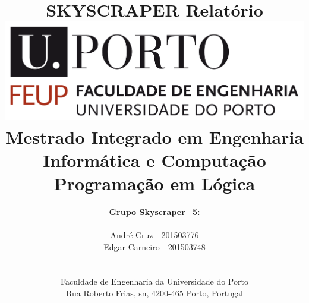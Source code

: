 \documentclass[a4paper]{article}
\begin{document}
\setlength{\textwidth}{16cm}
\setlength{\textheight}{22cm}

\title{\Huge\textbf{SKYSCRAPER}\linebreak\linebreak\linebreak
\Large\textbf{Relatório}\linebreak\linebreak
\linebreak\linebreak
\includegraphics[scale=0.1]{images/feup-logo.png}\linebreak\linebreak
\linebreak\linebreak
\Large{Mestrado Integrado em Engenharia Informática e Computação} \linebreak\linebreak
\Large{Programação em Lógica}\linebreak
}

\author{\textbf{Grupo Skyscraper\_5:}\\
\linebreak\\
André Cruz - 201503776 \\
Edgar Carneiro - 201503748 \\
\linebreak\linebreak \\
 \\ Faculdade de Engenharia da Universidade do Porto \\ Rua Roberto Frias, s\/n, 4200-465 Porto, Portugal \linebreak\linebreak\linebreak
\linebreak\linebreak\vspace{1cm}}

\maketitle
\thispagestyle{empty}
\end{document}
